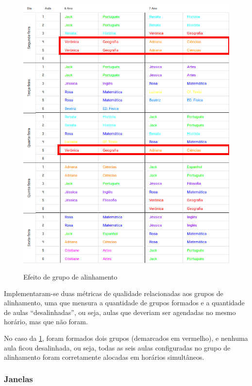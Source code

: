 \begin{figure}[!htb]
	\centering
	\caption{Efeito de grupo de alinhamento}
	\includegraphics[width=1\textwidth]{./dados/figuras/alinhados}
	\label{fig:alinhados}
\end{figure}
\pagebreak

Implementaram-se duas métricas de qualidade relacionadas aos grupos de alinhamento, uma que mensura a quantidade de grupos formados e a quantidade de aulas ``desalinhadas'', ou seja, aulas que deveriam ser agendadas no mesmo horário, mas que não foram.

No caso da \ref{fig:alinhados}, foram formados dois grupos (demarcados em vermelho), e nenhuma aula ficou desalinhada, ou seja, todas as seis aulas configuradas no grupo de alinhamento foram corretamente alocadas em horários simultâneos.

\subsubsection{Janelas}

